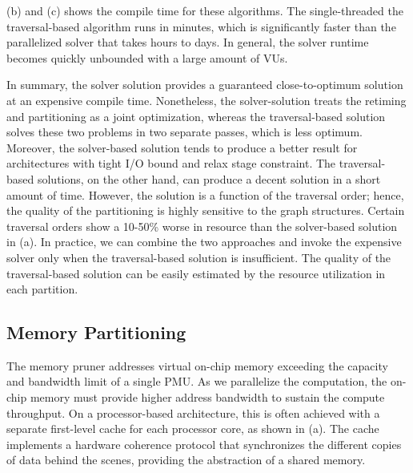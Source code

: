 (b) and (c) shows the compile time for these algorithms. The single-threaded
the traversal-based algorithm runs in minutes, which is significantly faster than the parallelized solver that takes hours to days.
In general, the solver runtime becomes quickly unbounded with a large amount of VUs.

In summary, the solver solution provides a guaranteed close-to-optimum solution at an expensive
compile time. Nonetheless, the solver-solution treats the retiming and partitioning as a joint optimization,
whereas the traversal-based solution solves these two problems in two separate passes,
which is less optimum.
Moreover, the solver-based solution tends to produce a better result for architectures with tight I/O
bound and relax stage constraint.
The traversal-based solutions, on the other hand, can produce a decent solution in a short amount of
time.
However, the solution is a function of the traversal order; hence, the quality of the partitioning
is highly sensitive to the graph structures.
Certain traversal orders show a 10-50\% worse in resource than the solver-based solution in 
 (a).
In practice, we can combine the two approaches and invoke the expensive solver only when the
traversal-based solution is insufficient. The quality of the traversal-based solution can be easily estimated by the resource utilization in each partition.


\subsection{Memory Partitioning} \label{sec:memsplit}
The memory pruner addresses virtual on-chip memory exceeding the capacity and bandwidth limit of a
single PMU.
As we parallelize the computation, the on-chip memory must provide higher address bandwidth to sustain the
compute throughput.
On a processor-based architecture, this is often achieved with a separate first-level
cache for each processor core, as shown in  (a).
The cache implements a hardware coherence protocol that synchronizes the different copies of data
behind the scenes,
providing the abstraction of a shared memory.

